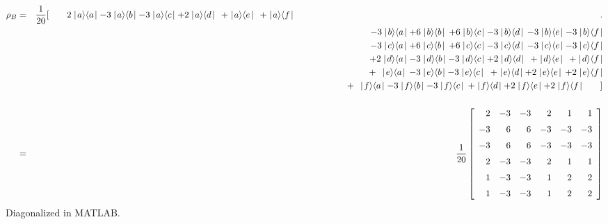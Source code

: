\begin{eqnarray*}
\rho_B &=& \frac{1}{20}[\qquad 2\kb{a}{a} - 3\kb{a}{b} - 3\kb{a}{c} + 2\kb{a}{d} \,\;+\kb{a}{e}\;\, + \kb{a}{f} \qquad\qquad\qquad\qquad\qquad\qquad\qquad\qquad\qquad\qquad 
			\qquad\qquad\qquad\qquad\qquad\qquad\qquad.\\
		&& \qquad  \:\:\:\,- 3\kb{b}{a} +6\kb{b}{b} \,+6\kb{b}{c}-3\kb{b}{d}\, -3\kb{b}{e} -3\kb{b}{f} \\
		&& \qquad  \:\:\:\,- 3\kb{c}{a} +6\kb{c}{b} \,+6\kb{c}{c}-3\kb{c}{d} \,-3\kb{c}{e} -3\kb{c}{f} \\
		&& \qquad  \:\:\:\,+ 2\kb{d}{a} - 3\kb{d}{b} - 3\kb{d}{c} + 2\kb{d}{d} \;\,+\kb{d}{e}\;\, + \kb{d}{f} \\
		&& \qquad  \:\:\:\,+ \;\,\kb{e}{a}\, -3\kb{e}{b} -3\kb{e}{c}\;\:+ \kb{e}{d} + 2\kb{e}{e} \,+ 2\kb{e}{f} \\
		&& \qquad  \:\:\:\,+ \;\,\kb{f}{a} -3\kb{f}{b} -3\kb{f}{c}\:+ \kb{f}{d} + 2\kb{f}{e} + 2\kb{f}{f} \qquad ] \\ \\ 
		&=& \frac{1}{20}\left[
			\begin {array}{rrrrrr}
			2&-3&-3&2&1&1\\
			\noalign{\medskip}
			-3&6&6&-3&-3&-3 \\ \noalign{\medskip}
			-3&6&6&-3&-3&-3 \\ \noalign{\medskip}
			2&-3&-3&2&1&1 \\ \noalign{\medskip}
			1&-3&-3&1&2&2 \\ \noalign{\medskip}
			1&-3&-3&1&2&2
			\end {array}
			\right]
\end{eqnarray*}
Diagonalized in MATLAB.
